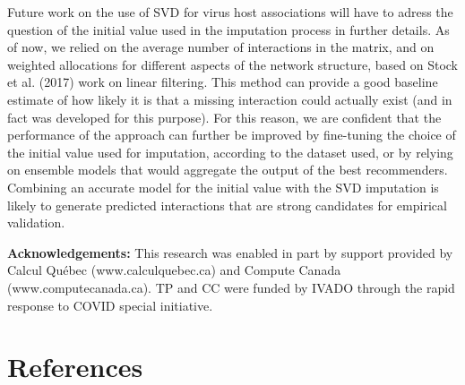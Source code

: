 \documentclass[10pt,oneside]{article}
\begin{document}
Future work on the use of SVD for virus host associations will have to
adress the question of the initial value used in the imputation process
in further details. As of now, we relied on the average number of
interactions in the matrix, and on weighted allocations for different
aspects of the network structure, based on Stock et al. (2017) work on
linear filtering. This method can provide a good baseline estimate of
how likely it is that a missing interaction could actually exist (and in
fact was developed for this purpose). For this reason, we are confident
that the performance of the approach can further be improved by
fine-tuning the choice of the initial value used for imputation,
according to the dataset used, or by relying on ensemble models that
would aggregate the output of the best recommenders. Combining an
accurate model for the initial value with the SVD imputation is likely
to generate predicted interactions that are strong candidates for
empirical validation.

\textbf{Acknowledgements:} This research was enabled in part by support
provided by Calcul Québec (www.calculquebec.ca) and Compute Canada
(www.computecanada.ca). TP and CC were funded by IVADO through the rapid
response to COVID special initiative.

\hypertarget{references}{%
\section*{References}\label{references}}
\end{document}
